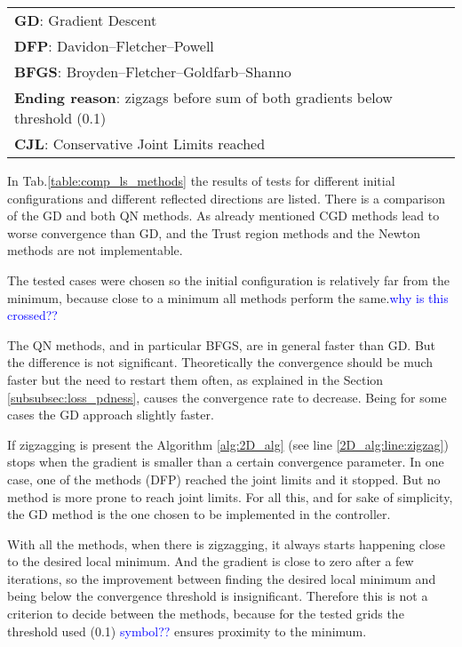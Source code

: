 \begin{table}[!h]
{\begin{tabular}{|c|c|c|c|c|c|c|c|}
			
			\multicolumn{8}{l}{\textbf{GD}: Gradient Descent}\\
			\multicolumn{8}{l}{\textbf{DFP}: Davidon–Fletcher–Powell}\\
			\multicolumn{8}{l}{\textbf{BFGS}: Broyden–Fletcher–Goldfarb–Shanno}\\
			\multicolumn{8}{l}{\textbf{Ending reason}: zigzags before sum of both gradients below threshold (0.1)}\\
			\multicolumn{8}{l}{\textbf{CJL}: Conservative Joint Limits reached}\\
		\end{tabular}%
			} 
\end{table}


In Tab.\ref{table:comp_ls_methods} the results of tests for different initial configurations and different reflected directions are listed. There is a comparison of the GD and both QN methods. As already mentioned CGD methods lead to worse convergence than GD, and the Trust region methods and the Newton methods are not implementable.

The tested cases were chosen so the initial configuration is relatively far from the minimum, because close to a minimum all methods perform the same.\textcolor{blue}{why is this crossed?? }

The QN methods, and in particular BFGS, are in general faster than GD. But the difference is not significant. Theoretically the convergence should be much faster but the need to restart them often, as explained in the Section \ref{subsubsec:loss_pdness}, causes the convergence rate to decrease. Being for some cases the GD approach slightly faster.

If zigzagging is present the Algorithm \ref{alg:2D_alg} (see line \ref{2D_alg:line:zigzag}) stops when the gradient is smaller than a certain convergence parameter. In one case, one of the methods (DFP) reached the joint limits and it stopped. But no method is more prone to reach joint limits. For all this, and for sake of simplicity, the GD method is the one chosen to be implemented in the controller.




With all the methods, when there is zigzagging, it always starts happening close to the desired local minimum. And the gradient is close to zero after a few iterations, so the improvement
between finding the desired local minimum and being below the convergence threshold is insignificant. Therefore this is not a criterion to decide between the methods,
because for the tested grids the threshold used (0.1) \textcolor{blue}{symbol?? } ensures proximity to the minimum.

